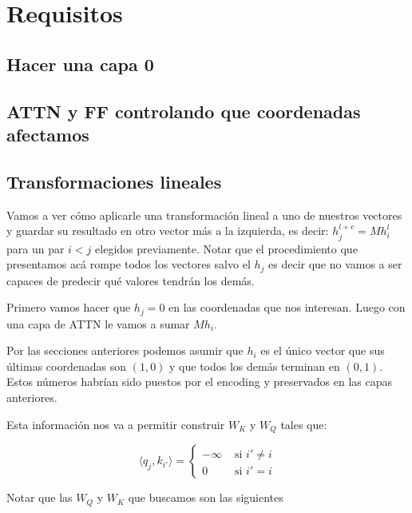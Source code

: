 \section*{Requisitos}

\subsection*{Hacer una capa 0}


\subsection*{ATTN y FF controlando que coordenadas afectamos}

\subsection*{Transformaciones lineales}
Vamos a ver cómo aplicarle una transformación lineal a uno de nuestros vectores y guardar su resultado en otro vector más a la izquierda, es decir: $h_j^{l+c} = M h_i^l$ para un par $i < j$ elegidos previamente. Notar que el procedimiento que presentamos acá rompe todos los vectores salvo el $h_j$ es decir que no vamos a ser capaces de predecir qué valores tendrán los demás. 

\bigskip

Primero vamos hacer que $h_j = 0$ en las coordenadas que nos interesan. Luego con una capa de ATTN le vamos a sumar $M h_i$.

Por las secciones anteriores podemos asumir que $h_i$ es el único vector que sus últimas coordenadas son $(1,0)$ y que todos los demás terminan en $(0,1)$. Estos números habrían sido puestos por el encoding y preservados en las capas anteriores.

Esta información nos va a permitir construir $W_K$ y $W_Q$ tales que:

\[
\langle q_{j}, k_{i'} \rangle = \begin{cases}
    -\infty &\text{ si } i' \neq i \\
    0  &\text{ si } i' = i 
\end{cases}
\]

Notar que las $W_Q$ y $W_K$ que buscamos son las siguientes

